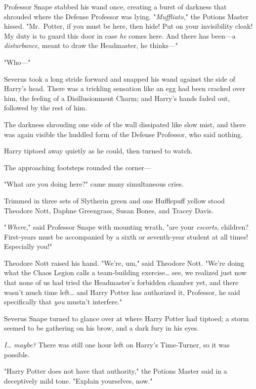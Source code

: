 Professor Snape stabbed his wand once, creating a burst of darkness that 
shrouded where the Defense Professor was lying. "\emph{Muffliato,}" the Potions 
Master hissed. "Mr.~Potter, if you must be here, then hide! Put on your 
invisibility cloak! My duty is to guard this door in case \emph{he} comes here. 
And there has been---a \emph{disturbance}, meant to draw the Headmaster, he 
thinks---"

"Who---"

Severus took a long stride forward and snapped his wand against the side of 
Harry's head. There was a trickling sensation like an egg had been cracked over 
him, the feeling of a Disillusionment Charm; and Harry's hands faded out, 
followed by the rest of him.

The darkness shrouding one side of the wall dissipated like slow mist, and 
there was again visible the huddled form of the Defense Professor, who said 
nothing.

Harry tiptoed away quietly as he could, then turned to watch.

The approaching footsteps rounded the corner---

"What are you doing here?" came many simultaneous cries.

Trimmed in three sets of Slytherin green and one Hufflepuff yellow stood 
Theodore Nott, Daphne Greengrass, Susan Bones, and Tracey Davis.

"\emph{Where,}" said Professor Snape with mounting wrath, "are your 
\emph{escorts,} children? First-years must be accompanied by a sixth or 
seventh-year student at all times! Especially you!"

Theodore Nott raised his hand. "We're, um," said Theodore Nott. "We're doing 
what the Chaos Legion calls a team-building exercise{\ldots} see, we realized 
just now that none of us had tried the Headmaster's forbidden chamber yet, and 
there wasn't much time left{\ldots} and Harry Potter has authorized it, 
Professor, he said specifically that \emph{you} mustn't interfere."

Severus Snape turned to glance over at where Harry Potter had tiptoed; a storm 
seemed to be gathering on his brow, and a dark fury in his eyes.

\emph{I{\ldots} maybe?} There was still one hour left on Harry's Time-Turner, 
so it was possible.

"Harry Potter does not have that authority," the Potions Master said in a 
deceptively mild tone. "Explain yourselves, now."

